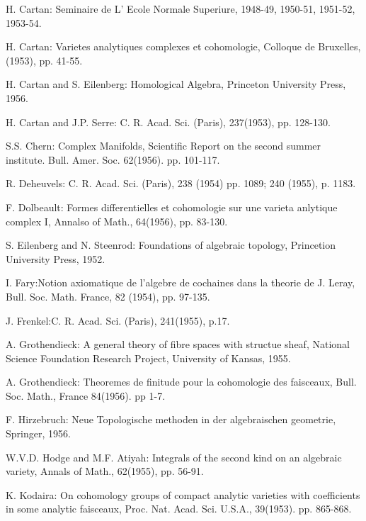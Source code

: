 \begin{thebibliography}{99}\pageoriginale
{} {H. Cartan}: Seminaire de L' Ecole Normale Superiure,
  1948-49, 1950-51, 1951-52, 1953-54. 

 {H. Cartan}: Varietes analytiques complexes et cohomologie,
  Colloque de Bruxelles, (1953), pp. 41-55. 

 {H. Cartan and S. Eilenberg}: Homological Algebra, Princeton
  University Press, 1956. 

 {H. Cartan and J.P. Serre}: C. R. Acad. Sci. (Paris),
  237(1953), pp. 128-130. 

 {S.S. Chern}: Complex Manifolds, Scientific Report on the
  second summer institute. Bull. Amer. Soc. 62(1956). pp. 101-117. 

 {R. Deheuvels}: C. R. Acad. Sci. (Paris), 238 (1954)
  pp. 1089; 240 (1955), p. 1183. 

 {F. Dolbeault}: Formes differentielles et cohomologie sur
  une varieta anlytique complex I, Annalso of Math., 64(1956),
  pp. 83-130. 

 {S. Eilenberg and N. Steenrod}: Foundations of algebraic
  topology, Princetion University Press, 1952. 

 {I. Fary}:Notion axiomatique de l'algebre de cochaines dans
  la theorie de J. Leray, Bull. Soc. Math. France, 82 (1954),
  pp. 97-135. 

 {J. Frenkel}:\pageoriginale C. R. Acad. Sci. (Paris),
  241(1955),  p.17. 

 {A. Grothendieck}: A general theory of fibre spaces with
  structue sheaf, National Science Foundation Research Project,
  University of Kansas, 1955. 

 {A. Grothendieck}: Theoremes de finitude pour la
  cohomologie des faisceaux, Bull. Soc. Math., France
  84(1956). pp 1-7. 

 {F. Hirzebruch}: Neue Topologische methoden in der
  algebraischen geometrie, Springer, 1956. 

 {W.V.D. Hodge and M.F. Atiyah}: Integrals of the second kind
  on an algebraic variety, Annals of Math., 62(1955), pp. 56-91. 

 {K. Kodaira}: On cohomology groups of compact analytic
  varieties with coefficients in some analytic faisceaux,
  Proc. Nat. Acad. Sci. U.S.A., 39(1953). pp. 865-868. 


\end{thebibliography}
